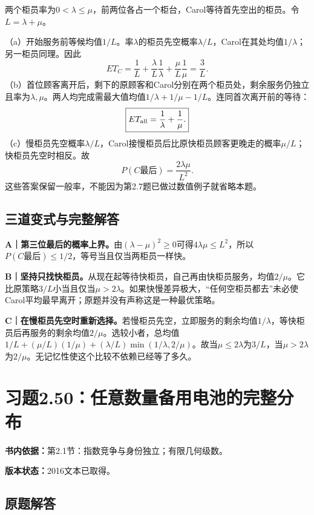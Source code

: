 \documentclass[
  11pt,
  a4paper,
  UTF8,fontset=fandol]{ctexart}
\let\OldSection\section
\renewcommand{\section}{\Needspace{7\baselineskip}\OldSection}
\let\OldSubsection\subsection
\renewcommand{\subsection}{\Needspace{5\baselineskip}\OldSubsection}
\begin{document}
两个柜员率为\(0<\lambda\le\mu\)，前两位各占一个柜台，Carol等待首先空出的柜员。令\(L=\lambda+\mu\)。

（a）开始服务前等候均值\(1/L\)。率\(\lambda\)的柜员先空概率\(\lambda/L\)，Carol在其处均值\(1/\lambda\)；另一柜员同理。因此
\[\boxed{E T_C=\frac1L+\frac\lambda L\frac1\lambda+\frac\mu L\frac1\mu=\frac3L.}\]
（b）首位顾客离开后，剩下的原顾客和Carol分别在两个柜员处，剩余服务仍独立且率为\(\lambda,\mu\)。两人均完成需最大值均值\(1/\lambda+1/\mu-1/L\)。连同首次离开前的等待：
\[\boxed{E T_{\rm all}=\frac1\lambda+\frac1\mu.}\]
（c）慢柜员先空概率\(\lambda/L\)，Carol接慢柜员后比原快柜员顾客更晚走的概率\(\mu/L\)；快柜员先空时相反。故
\[\boxed{P(C\text{最后})=\frac{2\lambda\mu}{L^2}.}\]
这些答案保留一般率，不能因为第2.7题已做过数值例子就省略本题。

\subsection{三道变式与完整解答}\label{ux4e09ux9053ux53d8ux5f0fux4e0eux5b8cux6574ux89e3ux7b54-48}

\textbf{A｜第三位最后的概率上界。}由\((\lambda-\mu)^2\ge0\)可得\(4\lambda\mu\le L^2\)，所以\(P(C\text{最后})\le1/2\)，等号当且仅当两柜员一样快。

\textbf{B｜坚持只找快柜员。}从现在起等待快柜员，自己再由快柜员服务，均值\(2/\mu\)。它比原策略\(3/L\)小当且仅当\(\mu>2\lambda\)。如果快慢差异极大，``任何空柜员都去''未必使Carol平均最早离开；原题并没有声称这是一种最优策略。

\textbf{C｜在慢柜员先空时重新选择。}若慢柜员先空，立即服务的剩余均值\(1/\lambda\)，等快柜员后再服务的剩余均值\(2/\mu\)。选较小者，总均值\(1/L+(\mu/L)(1/\mu)+(\lambda/L)\min(1/\lambda,2/\mu)\)。故当\(\mu\le2\lambda\)为\(3/L\)，当\(\mu>2\lambda\)为\(2/\mu\)。无记忆性使这个比较不依赖已经等了多久。

\newpage

\section{习题2.50：任意数量备用电池的完整分布}\label{ux4e60ux98982.50ux4efbux610fux6570ux91cfux5907ux7528ux7535ux6c60ux7684ux5b8cux6574ux5206ux5e03}

\textbf{书内依据：}第2.1节：指数竞争与身份独立；有限几何级数。

\textbf{版本状态：}2016文本已取得。

\subsection{原题解答}\label{ux539fux9898ux89e3ux7b54-49}
\end{document}
